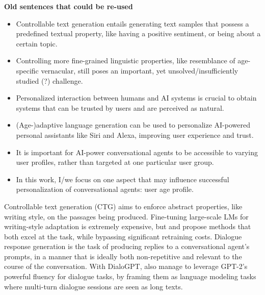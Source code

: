
\textbf{Old sentences that could be re-used}

\begin{itemize}
    \item Controllable text generation entails generating text samples that possess a predefined textual property, like having a positive sentiment, or being about a certain topic.
    \item Controlling more fine-grained linguistic properties, like resemblance of age-specific vernacular, still poses an important, yet unsolved/insufficiently studied (?) challenge.
    \item Personalized interaction between humans and AI systems is crucial to obtain systems that can be trusted by users and are perceived as natural.
    \item (Age-)adaptive language generation can be used to personalize AI-powered personal assistants like Siri and Alexa, improving user experience and trust.
    \item It is important for AI-power conversational agents to be accessible to varying user profiles, rather than targeted at one particular user group. 
    \item In this work, I/we focus on one aspect that may influence successful personalization of conversational agents: user age profile.
\end{itemize}

Controllable text generation (CTG) aims to enforce abstract properties, like writing style, on the passages being produced. Fine-tuning large-scale LMs for writing-style adaptation is extremely expensive, but \cite{dathathri2019plug} and \cite{li-etal-2020-optimus} propose methods that both excel at the task, while bypassing significant retraining costs. Dialogue response generation is the task of producing replies to a conversational agent's prompts, in a manner that is ideally both non-repetitive and relevant to the course of the conversation. With DialoGPT, \cite{zhang2019dialogpt} also manage to leverage GPT-2's powerful fluency for dialogue tasks, by framing them as language modeling tasks where multi-turn dialogue sessions are seen as long texts.


